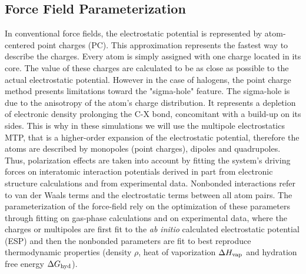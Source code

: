 \documentclass[journal=jacsat,manuscript=article]{achemso}
\begin{document}
\subsection{Force Field Parameterization}
In conventional force fields, the electrostatic potential is represented by atom-centered point charges (PC). This approximation represents the fastest way to describe the charges. Every atom is simply assigned with one charge located in its core. The value of these charges are calculated to be as close as possible to the actual electrostatic potential. However in the case of halogens, the point charge method presents limitations toward the "sigma-hole" feature. The sigma-hole is due to the anisotropy of the atom's charge distribution. It represents a depletion of electronic density prolonging the C-X bond, concomitant with a build-up on its sides. This is why in these simulations we will use the multipole electrostatics MTP, that is a higher-order expansion of the electrostatic potential, therefore the atoms are described by monopoles (point charges), dipoles and quadrupoles. Thus, polarization effects are taken into account by fitting the system's driving forces on interatomic interaction potentials derived in part from electronic structure calculations and from experimental data.
\noindent
 Nonbonded interactions refer to van der Waals terms and the electrostatic terms between all atom pairs. The parameterization of the force-field rely on the optimization of these parameters through fitting on gas-phase calculations and on experimental data, where the charges or multipoles are first fit to the {\it ab initio} calculated electrostatic potential (ESP) and then the nonbonded parameters are fit to best reproduce thermodynamic properties (density $\rho$, heat of vaporization $\Delta H_{\rm vap}$ and hydration free energy  $\Delta G_{\rm hyd}$). 
 
\end{document}
